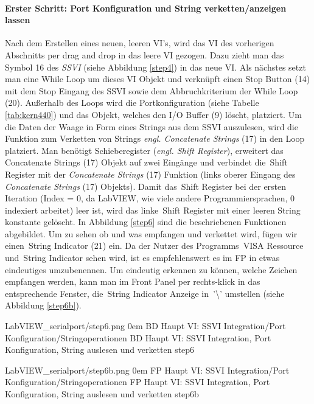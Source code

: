 {\paragraph{Erster Schritt: Port Konfiguration und String verketten/anzeigen lassen} Nach dem Erstellen eines neuen, leeren VI's, wird das VI des vorherigen Abschnitts per drag and drop in das leere VI gezogen. Dazu zieht man das Symbol 16 des \textit{SSVI} (siehe Abbildung \ref{step4}) in das neue VI. Als nächstes setzt man eine While Loop um dieses VI Objekt und verknüpft einen Stop Button (14) mit dem Stop Eingang des SSVI sowie dem Abbruchkriterium der While Loop (20). Außerhalb des Loops wird die Portkonfiguration (siehe Tabelle \ref{tab:kern440}) und das Objekt, welches den I/O Buffer (9) löscht, platziert. Um die Daten der Waage in Form eines Strings aus dem SSVI auszulesen, wird die Funktion zum Verketten von Strings \textit{engl. Concatenate Strings} (17) in den Loop platziert. Man benötigt Schieberegister (\textit{engl. Shift Register}), erweitert das \,{\Menlo Concatenate Strings} (17) Objekt auf zwei Eingänge und verbindet die \,{\Menlo Shift Register} mit der \textit{Concatenate Strings} (17) Funktion (links oberer Eingang des \textit{Concatenate Strings} (17) Objekts). Damit das \,{\Menlo Shift Register} bei der ersten Iteration (Index = 0, da LabVIEW, wie viele andere Programmiersprachen, 0 indexiert arbeitet) leer ist, wird das linke \,{\Menlo Shift Register} mit einer leeren String konstante gelöscht. In Abbildung \ref{step6} sind die beschriebenen Funktionen abgebildet. Um zu sehen ob und was empfangen und verkettet wird, fügen wir einen \,{\Menlo String Indicator} (21) ein. Da der Nutzer des Programms \,{\Menlo VISA Ressource} und \,{\Menlo String Indicator} sehen wird, ist es empfehlenswert es im FP in etwas eindeutiges umzubenennen. Um eindeutig erkennen zu können, welche Zeichen empfangen werden, kann man im Front Panel per rechts-klick in das entsprechende Fenster, die \,{\Menlo String Indicator} Anzeige in \,{\Menlo '\textbackslash'} umstellen (siehe Abbildung \ref{step6b}).

{LabVIEW_serialport/step6.png}
{0em}
{BD Haupt VI: SSVI Integration/Port Konfiguration/String\-operationen}
{BD Haupt VI: SSVI Integration, Port Konfiguration, String auslesen und \mbox{verketten}}
{step6}



{LabVIEW_serialport/step6b.png}
{0em}
{FP Haupt VI: SSVI Integration/Port Konfiguration/String\-operationen}
{FP Haupt VI: SSVI Integration, Port Konfiguration, String auslesen und \mbox{verketten}}
{step6b}

}
